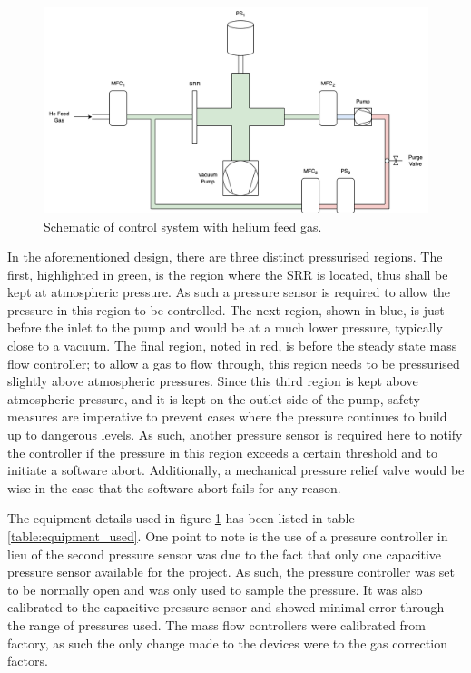 \begin{figure}[h!]
	\centering
	\includegraphics[width=\linewidth]{chapter_5/figures/He_control_system.png}
	\caption{Schematic of control system with helium feed gas.}
	\label{fig:He_control_system}
\end{figure}

In the aforementioned design, there are three distinct pressurised regions. The first, highlighted in green, is the region where the SRR is located, thus shall be kept at atmospheric pressure. As such a pressure sensor is required to allow the pressure in this region to be controlled. The next region, shown in blue, is just before the inlet to the pump and would be at a much lower pressure, typically close to a vacuum. The final region, noted in red, is before the steady state mass flow controller; to allow a gas to flow through, this region needs to be pressurised slightly above atmospheric pressures. Since this third region is kept above atmospheric pressure, and it is kept on the outlet side of the pump, safety measures are imperative to prevent cases where the pressure continues to build up to dangerous levels. As such, another pressure sensor is required here to notify the controller if the pressure in this region exceeds a certain threshold and to initiate a software abort. Additionally, a mechanical pressure relief valve would be wise in the case that the software abort fails for any reason. 

The equipment details used in figure \ref{fig:He_control_system} has been listed in table \ref{table:equipment_used}. One point to note is the use of a pressure controller in lieu of the second pressure sensor was due to the fact that only one capacitive pressure sensor available for the project. As such, the pressure controller was set to be normally open and was only used to sample the pressure. It was also calibrated to the capacitive pressure sensor and showed minimal error  through the range of pressures used. The mass flow controllers were calibrated from factory, as such the only change made to the devices were to the gas correction factors. 

